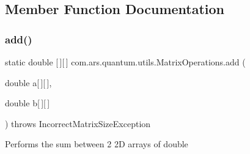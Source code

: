 \subsection{Member Function Documentation}
\hypertarget{classcom_1_1ars_1_1quantum_1_1utils_1_1_matrix_operations_af6e0ec44a13d9a89b249606514378bf8}{}\label{classcom_1_1ars_1_1quantum_1_1utils_1_1_matrix_operations_af6e0ec44a13d9a89b249606514378bf8} 
\subsubsection{\texorpdfstring{add()}{add()}\hspace{0.1cm}{\footnotesize\ttfamily [1/2]}}
{\footnotesize\ttfamily static double \mbox{[}$\,$\mbox{]}\mbox{[}$\,$\mbox{]} com.\+ars.\+quantum.\+utils.\+Matrix\+Operations.\+add (\begin{DoxyParamCaption}\item[{double}]{a\mbox{[}$\,$\mbox{]}\mbox{[}$\,$\mbox{]},  }\item[{double}]{b\mbox{[}$\,$\mbox{]}\mbox{[}$\,$\mbox{]} }\end{DoxyParamCaption}) throws Incorrect\+Matrix\+Size\+Exception\hspace{0.3cm}{\ttfamily [static]}}

Performs the sum between 2 2D arrays of double


